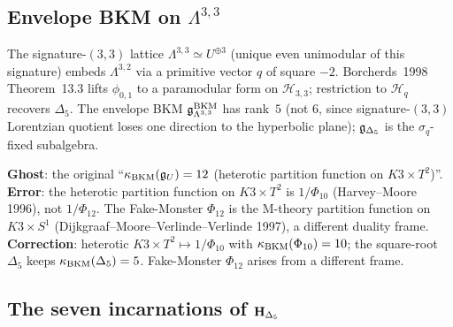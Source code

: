\subsection{Envelope BKM on $\Lambda^{3, 3}$}
\label{wn:subsec:healed-envelope}

\begin{theorem}\ClaimStatusHealed
\label{wn:thm:healed-envelope}
The signature-$(3, 3)$ lattice $\Lambda^{3, 3} \simeq U^{\oplus 3}$ (unique even unimodular of this signature) embeds $\Lambda^{3, 2}$ via a primitive vector $q$ of square $-2$. Borcherds~1998 Theorem~13.3 lifts $\phi_{0, 1}$ to a paramodular form on $\mathcal H_{3, 3}$; restriction to $\mathcal H_q$ recovers $\Delta_5$. The envelope BKM $\mathfrak{g}^{\mathrm{BKM}}_{\Lambda^{3, 3}}$ has rank~$5$ (not $6$, since signature-$(3, 3)$ Lorentzian quotient loses one direction to the hyperbolic plane); $\mathfrak{g}_{\Delta_5}$ is the $\sigma_q$-fixed subalgebra.
\end{theorem}

\textbf{Ghost}: the original ``$\kappa_{\mathrm{BKM}}(\mathfrak{g}_U) = 12$ (heterotic partition function on $K3 \times T^2$)''. \textbf{Error}: the heterotic partition function on $K3 \times T^2$ is $1/\Phi_{10}$ (Harvey--Moore 1996), not $1/\Phi_{12}$. The Fake-Monster $\Phi_{12}$ is the M-theory partition function on $K3 \times S^1$ (Dijkgraaf--Moore--Verlinde--Verlinde 1997), a different duality frame. \textbf{Correction}: heterotic $K3 \times T^2 \mapsto 1/\Phi_{10}$ with $\kappa_{\mathrm{BKM}}(\Phi_{10})=10$; the square-root $\Delta_5$ keeps $\kappa_{\mathrm{BKM}}(\Delta_5)=5$. Fake-Monster $\Phi_{12}$ arises from a different frame.

\subsection{The seven incarnations of $\mathbf{H}_{\Delta_5}$}
\label{wn:subsec:healed-seven-incarnations}

